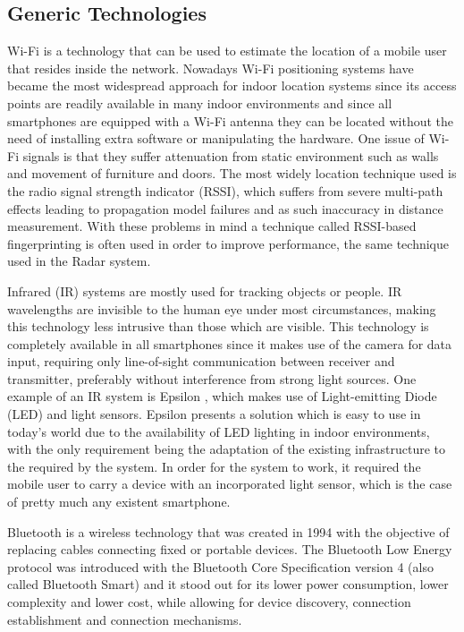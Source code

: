 \documentclass[a4paper]{IEEEtran}
\begin{document}
 
\subsection{Generic Technologies} 
\label{subsec:gentech} 
 
 
Wi-Fi is a technology that can be used to estimate the location of a mobile user that resides inside the network. Nowadays Wi-Fi positioning systems have became the most widespread approach for indoor location systems since its access points are readily available in many indoor environments and since all smartphones are equipped with a Wi-Fi antenna they can be located without the need of installing extra software or manipulating the hardware. One issue of Wi-Fi signals is that they suffer attenuation from static environment such as walls and movement of furniture and doors. The most widely location technique used is the radio signal strength indicator (RSSI), which suffers from severe multi-path effects leading to propagation model failures and as such inaccuracy in distance measurement. With these problems in mind a technique called RSSI-based fingerprinting is often used in order to improve performance, the same technique used in the Radar system. 
 
 
Infrared (IR) systems are mostly used for tracking objects or people. IR wavelengths are invisible to the human eye under most circumstances, making this technology less intrusive than those which are visible. This technology is completely available in all smartphones since it makes use of the camera for data input, requiring only line-of-sight communication between receiver and transmitter, preferably without interference from strong light sources. One example of an IR system is Epsilon \cite{epsilon}, which makes use of Light-emitting Diode (LED) and light sensors. Epsilon presents a solution which is easy to use in today's world due to the availability of LED lighting in indoor environments, with the only requirement being the adaptation of the existing infrastructure to the required by the system. In order for the system to work, it required the mobile user to carry a device with an incorporated light sensor, which is the case of pretty much any existent smartphone. 
 
 
Bluetooth is a wireless technology that was created in 1994 with the objective of replacing cables connecting fixed or portable devices. The Bluetooth Low Energy protocol was introduced with the Bluetooth Core Specification version 4 (also called Bluetooth Smart) \cite{BLECore} and it stood out for its lower power consumption, lower complexity and lower cost, while allowing for  device discovery, connection establishment and connection mechanisms.  
 
\end{document}

